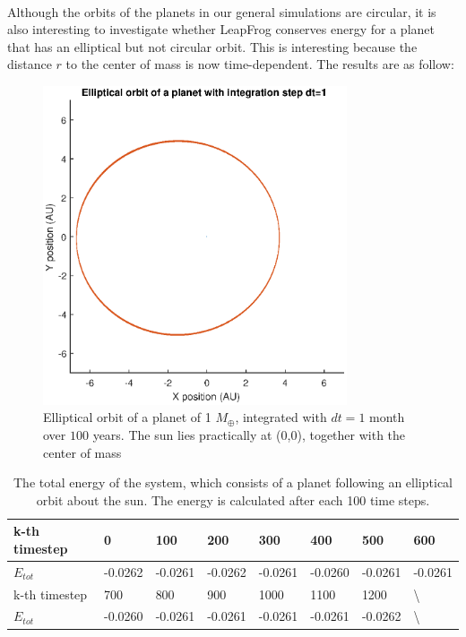 \leavevmode
\\
Although the orbits of the planets in our general simulations are circular, it is also interesting to investigate whether LeapFrog conserves energy for a planet that has an elliptical but not circular orbit. This is interesting because the distance $r$ to the center of mass is now time-dependent. The results are as follow:
\begin{figure}[H]
\centering
\includegraphics[width=0.8\textwidth]{elliptisch100jaar.eps}
\caption{Elliptical orbit of a planet of 1 $M_{\oplus}$, integrated with $dt=1$ month over $100$ years. The sun lies practically at (0,0), together with the center of mass}
    \label{fig:Planetellipse}
\end{figure}
\begin{table}[htb]
\centering
\caption{The total energy of the system, which consists of a planet following an elliptical orbit about the sun. The energy is calculated after each 100 time steps.}
\label{my-label}
\begin{tabular}{|l|l|l|l|l|l|l|l|}
\hline
k-th timestep &0 &100 & 200 & 300 & 400 & 500 & 600\\ \hline
$E_{tot}$     &  -0.0262&   -0.0261&   -0.0262&   -0.0261&   -0.0260&   -0.0261&   -0.0261 \\ \hline
k-th timestep & 700 & 800 & 900 & 1000 & 1100  & 1200& \:\:\:\:\:\:\textbackslash   \\ \hline
$E_{tot}$& -0.0260  & -0.0261  & -0.0261  & -0.0261  & -0.0261& -0.0262&\:\:\:\:\:\:\textbackslash  \\ \hline
\end{tabular}
\label{tab:PlanetellipseEnergy}
\end{table}
